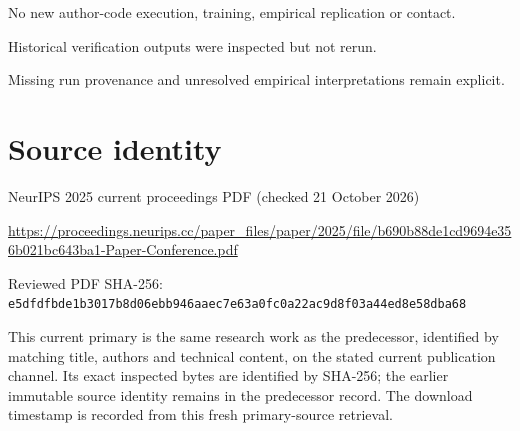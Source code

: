 \documentclass[11pt]{article}
\begin{document}
No new author-code execution, training, empirical replication or contact.\par

Historical verification outputs were inspected but not rerun.\par

Missing run provenance and unresolved empirical interpretations remain explicit.\par

\section*{Source identity}

NeurIPS 2025 current proceedings PDF (checked 21 October 2026)

\url{https://proceedings.neurips.cc/paper_files/paper/2025/file/b690b88de1cd9694e356b021bc643ba1-Paper-Conference.pdf}

Reviewed PDF SHA-256: \nolinkurl{e5dfdfbde1b3017b8d06ebb946aaec7e63a0fc0a22ac9d8f03a44ed8e58dba68}

This current primary is the same research work as the predecessor, identified by matching title, authors and technical content, on the stated current publication channel. Its exact inspected bytes are identified by SHA-256; the earlier immutable source identity remains in the predecessor record. The download timestamp is recorded from this fresh primary-source retrieval.
\end{document}
